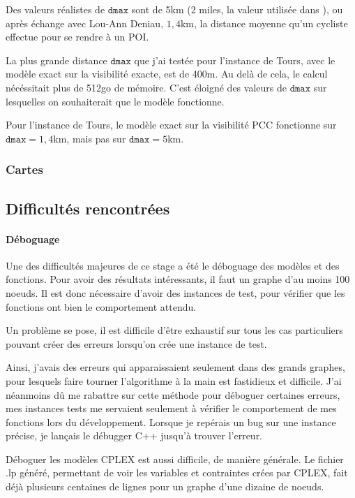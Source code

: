 Des valeurs réalistes de $\texttt{dmax}$ sont de 5km (2 miles, la valeur utilisée dans \cite{kent_karner}), ou après échange avec Lou-Ann Deniau, $1,4$km, la distance moyenne qu'un cycliste effectue pour se rendre à un POI.

La plus grande distance $\texttt{dmax}$ que j'ai testée pour l'instance de Tours, avec le modèle exact sur la visibilité exacte, est de 400m. Au delà de cela, le calcul nécéssitait plus de 512go de mémoire. C'est éloigné des valeurs de $\texttt{dmax}$ sur lesquelles on souhaiterait que le modèle fonctionne.

Pour l'instance de Tours, le modèle exact sur la visibilité PCC fonctionne sur $\texttt{dmax}=1,4$km, mais pas sur $\texttt{dmax}=5$km.



\subsubsection{Cartes}

\subsection{Difficultés rencontrées}

\paragraph{Déboguage}

Une des difficultés majeures de ce stage a été le déboguage des modèles et des fonctions. Pour avoir des résultats intéressants, il faut un graphe d'au moins 100 noeuds. Il est donc nécessaire d'avoir des instances de test, pour vérifier que les fonctions ont bien le comportement attendu.

Un problème se pose, il est difficile d'être exhaustif sur tous les cas particuliers pouvant créer des erreurs lorsqu'on crée une instance de test.

Ainsi, j'avais des erreurs qui apparaissaient seulement dans des grands graphes, pour lesquels faire tourner l'algorithme à la main est fastidieux et difficile. J'ai néanmoins dû me rabattre sur cette méthode pour déboguer certaines erreurs, mes instances tests me servaient seulement à vérifier le comportement de mes fonctions lors du développement. Lorsque je repérais un bug sur une instance précise, je lançais le débugger C++ jusqu'à trouver l'erreur.

Déboguer les modèles CPLEX est aussi difficile, de manière générale. Le fichier .lp généré, permettant de voir les variables et contraintes crées par CPLEX, fait déjà plusieurs centaines de lignes pour un graphe d'une dizaine de noeuds.

